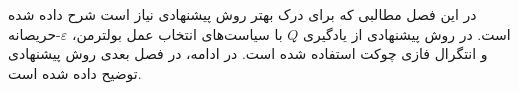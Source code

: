 در این فصل مطالبی که برای درک بهتر روش پیشنهادی نیاز است شرح داده شده است. در روش پیشنهادی از یادگیری $Q$ با سیاست‌های انتخاب عمل بولترمن، $\varepsilon$-حریصانه و انتگرال فازی چوکت استفاده ‌شده است. در ادامه، در فصل بعدی روش پیشنهادی توضیح داده شده است.
